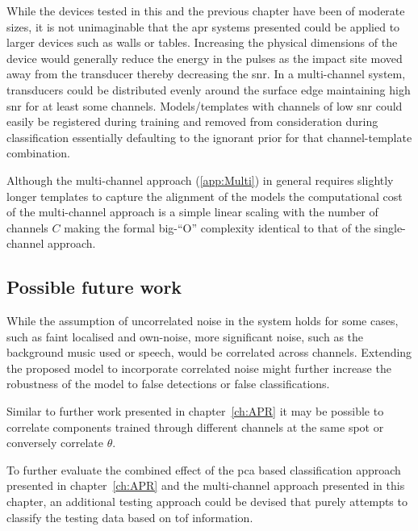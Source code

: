 While the devices tested in this and the previous chapter have been of moderate sizes, it is not unimaginable that the \gls{apr} systems presented could be applied to larger devices such as walls or tables. Increasing the physical dimensions of the device would generally reduce the energy in the pulses as the impact site moved away from the transducer thereby decreasing the \gls{snr}. In a multi-channel system, transducers could be distributed evenly around the surface edge maintaining high \gls{snr} for at least some channels. Models/templates with channels of low \gls{snr} could easily be registered during training and removed from consideration during classification essentially defaulting to the ignorant prior for that channel-template combination.

Although the multi-channel approach (\ref{app:Multi}) in general requires slightly longer templates to capture the alignment of the models the computational cost of the multi-channel approach is a simple linear scaling with the number of channels $C$ making the formal big-``O'' complexity identical to that of the single-channel approach.

\subsection{Possible future work}
While the assumption of uncorrelated noise in the system holds for some cases, such as faint localised and own-noise, more significant noise, such as the background music used or speech, would be correlated across channels. Extending the proposed model to incorporate correlated noise might further increase the robustness of the model to false detections or false classifications.

Similar to further work presented in chapter~\ref{ch:APR} it may be possible to correlate components trained through different channels at the same spot or conversely correlate $\theta$.



To further evaluate the combined effect of the \gls{pca} based classification approach presented in chapter~\ref{ch:APR} and the multi-channel approach presented in this chapter, an additional testing approach could be devised that purely attempts to classify the testing data based on \gls{tof} information.



